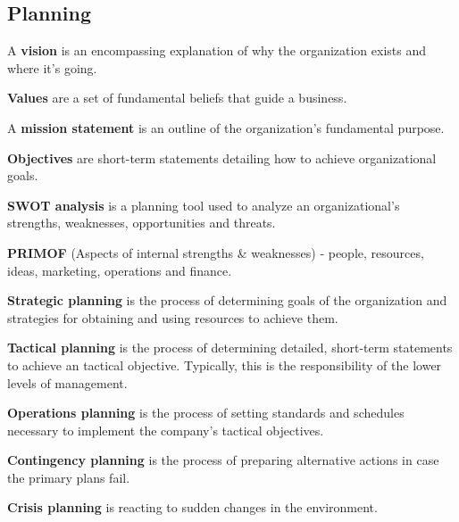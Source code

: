 \documentclass[english, 12pt]{article}
\begin{document}
\subsection{Planning}
\begin{defn}
A \textbf{vision} is an encompassing explanation of why the organization exists and where it's going.
\end{defn}
\begin{defn}
\textbf{Values} are a set of fundamental beliefs that guide a business.
\end{defn}
\begin{defn}
A \textbf{mission statement} is an outline of the organization's fundamental purpose.
\end{defn}
\begin{defn}
\textbf{Objectives} are short-term statements detailing how to achieve organizational goals.
\end{defn}
\begin{defn}
\textbf{SWOT analysis} is a planning tool used to analyze an organizational's strengths, weaknesses, opportunities and threats.
\end{defn}
\begin{exmp}
\textbf{PRIMOF} (Aspects of internal strengths \& weaknesses) - people, resources, ideas, marketing, operations and finance.
\end{exmp}
\begin{defn}
\textbf{Strategic planning} is the process of determining goals of the organization and strategies for obtaining and using resources to achieve them.
\end{defn}
\begin{defn}
\textbf{Tactical planning} is the process of determining detailed, short-term statements to achieve an tactical objective. Typically, this is the responsibility of the lower levels of management.
\end{defn}
\begin{defn}
\textbf{Operations planning} is the process of setting standards and schedules necessary to implement the company's tactical objectives.
\end{defn}
\begin{defn}
\textbf{Contingency planning} is the process of preparing alternative actions in case the primary plans fail.
\end{defn}
\begin{defn}
\textbf{Crisis planning} is reacting to sudden changes in the environment.
\end{defn}
\end{document}
